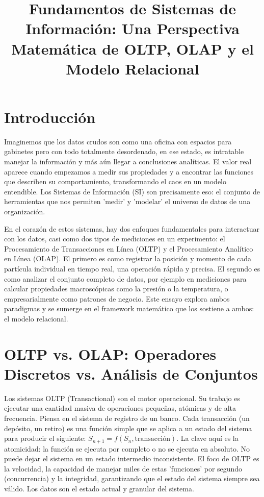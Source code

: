 \documentclass[12pt, letterpaper]{article}
\title{\textbf{Fundamentos de Sistemas de Información: Una Perspectiva Matemática de OLTP, OLAP y el Modelo Relacional}}
\begin{document}
\maketitle

\section*{Introducción}

Imaginemos que los datos crudos son como una oficina con espacios para gabinetes pero con todo totalmente desordenado, en ese estado, es intratable manejar la información y más aún llegar a conclusiones analíticas. El valor real aparece cuando empezamos a medir sus propiedades y a encontrar las funciones que describen su comportamiento, transformando el caos en un modelo entendible. Los Sistemas de Información (SI) son precisamente eso: el conjunto de herramientas que nos permiten 'medir' y 'modelar' el universo de datos de una organización.

En el corazón de estos sistemas, hay dos enfoques fundamentales para interactuar con los datos, casi como dos tipos de mediciones en un experimento: el Procesamiento de Transacciones en Línea (OLTP) y el Procesamiento Analítico en Línea (OLAP). El primero es como registrar la posición y momento de cada partícula individual en tiempo real, una operación rápida y precisa. El segundo es como analizar el conjunto completo de datos, por ejemplo en mediciones para calcular propiedades macroscópicas como la presión o la temperatura, o empresarialmente como patrones de negocio. Este ensayo explora ambos paradigmas y se sumerge en el framework matemático que los sostiene a ambos: el modelo relacional.

\section*{OLTP vs. OLAP: Operadores Discretos vs. Análisis de Conjuntos}

Los sistemas OLTP (Transactional) son el motor operacional. Su trabajo es ejecutar una cantidad masiva de operaciones pequeñas, atómicas y de alta frecuencia. Piensa en el sistema de registro de un banco. Cada transacción (un depósito, un retiro) es una función simple que se aplica a un estado del sistema para producir el siguiente: $S_{n+1} = f(S_n, \text{transacción})$. La clave aquí es la atomicidad: la función se ejecuta por completo o no se ejecuta en absoluto. No puede dejar el sistema en un estado intermedio inconsistente. El foco de OLTP es la velocidad, la capacidad de manejar miles de estas 'funciones' por segundo (concurrencia) y la integridad, garantizando que el estado del sistema siempre sea válido. Los datos son el estado actual y granular del sistema.
\end{document}
